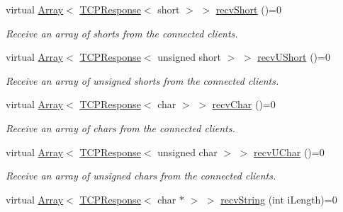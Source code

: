 \begin{DoxyCompactItemize}
virtual \mbox{\hyperlink{class_rad_j_a_v_1_1_array}{Array}}$<$ \mbox{\hyperlink{class_rad_j_a_v_1_1_networking_1_1_t_c_p_response}{T\+C\+P\+Response}}$<$ short $>$ $>$ \mbox{\hyperlink{class_rad_j_a_v_1_1_networking_1_1_tcpip_server_adb65a13201a5a115b5038e0aac0210c1}{recv\+Short}} ()=0
\begin{DoxyCompactList}\small\item\em Receive an array of shorts from the connected clients. \end{DoxyCompactList}\item 
virtual \mbox{\hyperlink{class_rad_j_a_v_1_1_array}{Array}}$<$ \mbox{\hyperlink{class_rad_j_a_v_1_1_networking_1_1_t_c_p_response}{T\+C\+P\+Response}}$<$ unsigned short $>$ $>$ \mbox{\hyperlink{class_rad_j_a_v_1_1_networking_1_1_tcpip_server_aa6c287a4837db82dc965bd004b6d5c7c}{recv\+U\+Short}} ()=0
\begin{DoxyCompactList}\small\item\em Receive an array of unsigned shorts from the connected clients. \end{DoxyCompactList}\item 
virtual \mbox{\hyperlink{class_rad_j_a_v_1_1_array}{Array}}$<$ \mbox{\hyperlink{class_rad_j_a_v_1_1_networking_1_1_t_c_p_response}{T\+C\+P\+Response}}$<$ char $>$ $>$ \mbox{\hyperlink{class_rad_j_a_v_1_1_networking_1_1_tcpip_server_a35edbb3d6befdeeba135ebf27753c6dc}{recv\+Char}} ()=0
\begin{DoxyCompactList}\small\item\em Receive an array of chars from the connected clients. \end{DoxyCompactList}\item 
virtual \mbox{\hyperlink{class_rad_j_a_v_1_1_array}{Array}}$<$ \mbox{\hyperlink{class_rad_j_a_v_1_1_networking_1_1_t_c_p_response}{T\+C\+P\+Response}}$<$ unsigned char $>$ $>$ \mbox{\hyperlink{class_rad_j_a_v_1_1_networking_1_1_tcpip_server_a40def27a12921b7f399337920b88fdd0}{recv\+U\+Char}} ()=0
\begin{DoxyCompactList}\small\item\em Receive an array of unsigned chars from the connected clients. \end{DoxyCompactList}\item 
virtual \mbox{\hyperlink{class_rad_j_a_v_1_1_array}{Array}}$<$ \mbox{\hyperlink{class_rad_j_a_v_1_1_networking_1_1_t_c_p_response}{T\+C\+P\+Response}}$<$ char $\ast$ $>$ $>$ \mbox{\hyperlink{class_rad_j_a_v_1_1_networking_1_1_tcpip_server_aa610e07c79aa751e89621cd63df32c2b}{recv\+String}} (int i\+Length)=0

\end{DoxyCompactItemize}
